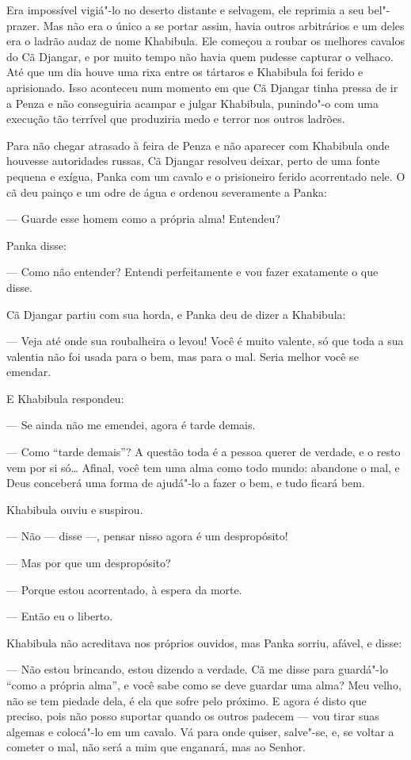 Era impossível vigiá"-lo no deserto distante e selvagem, ele reprimia a
seu bel"-prazer. Mas não era o único a se portar assim, havia outros
arbitrários e um deles era o ladrão audaz de nome Khabibula. Ele começou
a roubar os melhores cavalos do Cã Djangar, e por muito tempo não havia
quem pudesse capturar o velhaco. Até que um dia houve uma rixa entre os
tártaros e Khabibula foi ferido e aprisionado. Isso aconteceu num
momento em que Cã Djangar tinha pressa de ir a Penza e não conseguiria
acampar e julgar Khabibula, punindo"-o com uma execução tão terrível que
produziria medo e terror nos outros ladrões.

Para não chegar atrasado à feira de Penza e não aparecer com Khabibula
onde houvesse autoridades russas, Cã Djangar resolveu deixar, perto de
uma fonte pequena e exígua, Panka com um cavalo e o prisioneiro ferido
acorrentado nele. O cã deu painço e um odre de água e ordenou
severamente a Panka:

--- Guarde esse homem como a própria alma! Entendeu?

Panka disse:

--- Como não entender? Entendi perfeitamente e vou fazer exatamente o
que disse.

Cã Djangar partiu com sua horda, e Panka deu de dizer a Khabibula:

--- Veja até onde sua roubalheira o levou! Você é muito valente, só
que toda a sua valentia não foi usada para o bem, mas para o mal. Seria
melhor você se emendar.

E Khabibula respondeu:

--- Se ainda não me emendei, agora é tarde demais.

--- Como ``tarde demais''? A questão toda é a pessoa querer de verdade,
e o resto vem por si só\ldots{} Afinal, você tem uma alma como todo mundo:
abandone o mal, e Deus conceberá uma forma de ajudá"-lo a fazer o bem, e
tudo ficará bem.

Khabibula ouviu e suspirou.

--- Não --- disse ---, pensar nisso agora é um despropósito!

--- Mas por que um despropósito?

--- Porque estou acorrentado, à espera da morte.

--- Então eu o liberto.

Khabibula não acreditava nos próprios ouvidos, mas Panka sorriu, afável,
e disse:

--- Não estou brincando, estou dizendo a verdade. Cã me disse para
guardá"-lo ``como a própria alma'', e você sabe como se deve guardar uma
alma? Meu velho, não se tem piedade dela, é ela que sofre pelo próximo.
E agora é disto que preciso, pois não posso suportar quando os outros
padecem --- vou tirar suas algemas e colocá"-lo em um cavalo. Vá para
onde quiser, salve"-se, e, se voltar a cometer o mal, não será a mim que
enganará, mas ao Senhor.

